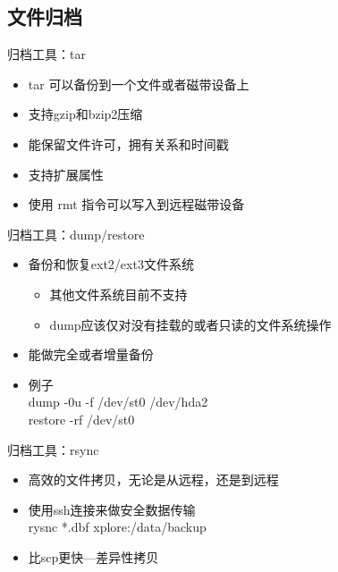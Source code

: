 \subsection{文件归档}

\begin{frame}{归档工具：tar}
\begin{itemize}
\item tar 可以备份到一个文件或者磁带设备上
\item 支持gzip和bzip2压缩
\item 能保留文件许可，拥有关系和时间戳
\item 支持扩展属性
\item 使用 rmt 指令可以写入到远程磁带设备
\end{itemize}

\end{frame} 
\begin{frame}{归档工具：dump/restore}
\begin{itemize}
\item 备份和恢复ext2/ext3文件系统

\begin{itemize}
\item 其他文件系统目前不支持
\item dump应该仅对没有挂载的或者只读的文件系统操作
\end{itemize}
\item 能做完全或者增量备份
\item 例子\\
dump -0u -f /dev/st0 /dev/hda2\\
restore -rf /dev/st0
\end{itemize}

\end{frame} 
\begin{frame}{归档工具：rsync}
\begin{itemize}
\item 高效的文件拷贝，无论是从远程，还是到远程
\item 使用ssh连接来做安全数据传输\\
rysnc {*}.dbf xplore:/data/backup
\item 比scp更快---差异性拷贝
\end{itemize}
\end{frame} 
%
%
%
%

